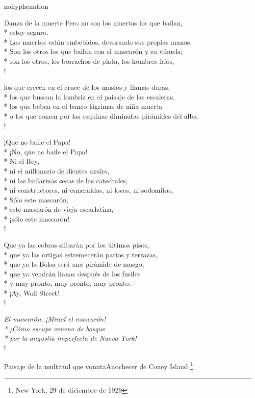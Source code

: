 \documentclass[
    a5paper,
    DIV=10,
    12pt,
    notitlepage,
    oneside,]
{scrbook} %
\begin{document}
\begin{hyphenrules}{nohyphenation}
\begin{poem}{Danza de la muerte}{}{\vspace{-1em}}
Pero no son los muertos los que bailan,\\*
estoy seguro.\\*
Los muertos están embebidos, devorando sus propias manos.\\*
Son los otros los que bailan con el mascarón y su vihuela;\\*
son los otros, los borrachos de plata, los hombres fríos, \\!

los que crecen en el cruce de los muslos y llamas duras,\\*
los que buscan la lombriz en el paisaje de las escaleras,\\*
los que beben en el banco lágrimas de niña muerta\\*
o los que comen por las esquinas diminutas pirámides del alba.\\!

¡Que no baile el Papa!\\*
¡No, que no baile el Papa!\\*
Ni el Rey,\\*
ni el millonario de dientes azules,\\*
ni las bailarinas secas de las catedrales,\\*
ni constructores, ni esmeraldas, ni locos, ni sodomitas.\\*
Sólo este mascarón,\\*
este mascarón de vieja escarlatina,\\*
¡sólo este mascarón! \\!

Que ya las cobras silbarán por los últimos pisos,\\*
que ya las ortigas estremecerán patios y terrazas,\\*
que ya la Bolsa será una pirámide de musgo,\\*
que ya vendrán lianas después de los fusiles\\*
y muy pronto, muy pronto, muy pronto.\\*
¡Ay, Wall Street! \\!

\emph{El mascarón. ¡Mirad el mascarón!\\*
¡Cómo escupe veneno de bosque\\*
por la angustia imperfecta de Nueva York!} \\!

\end{poem}

\begin{poem}{Paisaje de la multitud que vomita}{Anochecer de Coney Island \footnote{New York, 29 de diciembre de 1929}}{}


\end{poem}
\end{hyphenrules}
\end{document}
